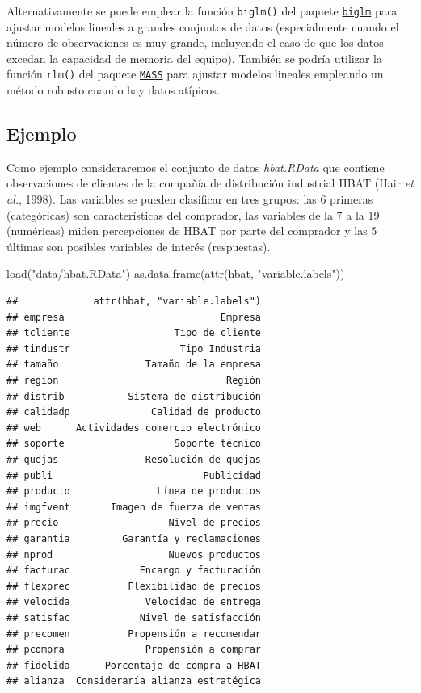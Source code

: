 \documentclass[
]{book}
\newenvironment{Shaded}{\begin{snugshade}}{\end{snugshade}}
\newcommand{\FunctionTok}[1]{\textcolor[rgb]{0.00,0.00,0.00}{#1}}
\newcommand{\NormalTok}[1]{#1}
\newcommand{\StringTok}[1]{\textcolor[rgb]{0.31,0.60,0.02}{#1}}
\theoremstyle{break}
\theoremstyle{definition}
\theoremstyle{definition}
\theoremstyle{definition}
\theoremstyle{definition}
\theoremstyle{remark}
\begin{document}
Alternativamente se puede emplear la función \texttt{biglm()} del paquete \href{https://CRAN.R-project.org/package=biglm}{\texttt{biglm}} para ajustar modelos lineales a grandes conjuntos de datos (especialmente cuando el número de observaciones es muy grande, incluyendo el caso de que los datos excedan la capacidad de memoria del equipo).
También se podría utilizar la función \texttt{rlm()} del paquete \href{https://CRAN.R-project.org/package=MASS}{\texttt{MASS}} para ajustar modelos lineales empleando un método robusto cuando hay datos atípicos.

\hypertarget{ejemplo-2}{%
\subsection{Ejemplo}\label{ejemplo-2}}

Como ejemplo consideraremos el conjunto de datos \emph{hbat.RData} que contiene observaciones de clientes de la compañía de distribución industrial HBAT (Hair \emph{et al.}, 1998).
Las variables se pueden clasificar en tres grupos: las 6 primeras (categóricas) son características del comprador, las variables de la 7 a la 19 (numéricas) miden percepciones de HBAT por parte del comprador y las 5 últimas son posibles variables de interés (respuestas).

\begin{Shaded}
\begin{Highlighting}[]
\FunctionTok{load}\NormalTok{(}\StringTok{"data/hbat.RData"}\NormalTok{)}
\FunctionTok{as.data.frame}\NormalTok{(}\FunctionTok{attr}\NormalTok{(hbat, }\StringTok{"variable.labels"}\NormalTok{))}
\end{Highlighting}
\end{Shaded}

\begin{verbatim}
##             attr(hbat, "variable.labels")
## empresa                           Empresa
## tcliente                  Tipo de cliente
## tindustr                   Tipo Industria
## tamaño               Tamaño de la empresa
## region                             Región
## distrib           Sistema de distribución
## calidadp              Calidad de producto
## web      Actividades comercio electrónico
## soporte                   Soporte técnico
## quejas               Resolución de quejas
## publi                          Publicidad
## producto               Línea de productos
## imgfvent       Imagen de fuerza de ventas
## precio                   Nivel de precios
## garantia         Garantía y reclamaciones
## nprod                    Nuevos productos
## facturac            Encargo y facturación
## flexprec          Flexibilidad de precios
## velocida             Velocidad de entrega
## satisfac            Nivel de satisfacción
## precomen          Propensión a recomendar
## pcompra              Propensión a comprar
## fidelida      Porcentaje de compra a HBAT
## alianza  Consideraría alianza estratégica
\end{verbatim}
\end{document}
